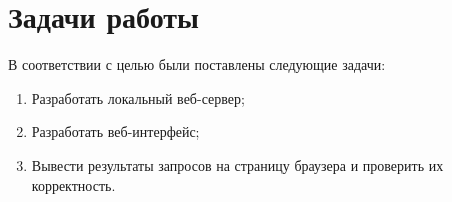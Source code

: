 \chapter{Задачи работы}
\label{cha:tasks}

В соответствии с целью были поставлены следующие задачи:

\begin{enumerate}
    \item Разработать локальный веб-сервер;
    \item Разработать веб-интерфейс;
    \item Вывести результаты запросов на страницу браузера и проверить их корректность.
\end{enumerate}